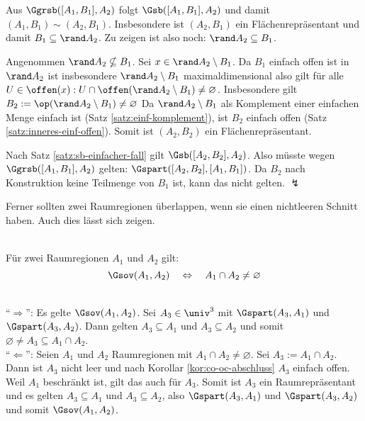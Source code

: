     \begin{bew}
        Aus $\Ggrsb([A_1,B_1],A_2)$ folgt $\Gsb([A_1,B_1],A_2)$ und damit\\
        $(A_1,B_1) \sim (A_2,B_1)$.
        Insbesondere ist $(A_2,B_1)$ ein Flächenrepräsentant und damit $B_1 \subseteq \rand A_2$.
        Zu zeigen ist also noch: $\rand A_2 \subseteq B_1$.

        Angenommen $\rand A_2 \nsubseteq B_1$.
        Sei $x \in \rand A_2 \setminus B_1$. 
        Da $B_1$ einfach offen ist in $\rand A_2$ ist insbesondere $\rand A_2 \setminus B_1$ maximaldimensional also gilt für alle $U \in \offen(x): U \cap \offen(\rand A_2 \setminus B_1) \neq \varnothing$.
        Insbesondere gilt $B_2 := \op(\rand A_2 \setminus B_1) \neq \varnothing$
        Da $\rand A_2 \setminus B_1$ als Komplement einer einfachen Menge einfach ist (Satz \ref{satz:einf-komplement}), ist $B_2$ einfach offen (Satz \ref{satz:inneres-einf-offen}).
        Somit ist $(A_2,B_2)$ ein Flächenrepräsentant.

        Nach Satz \ref{satz:sb-einfacher-fall} gilt $\Gsb([A_2,B_2],A_2)$.
        Also müsste wegen\\
        $\Ggrsb([A_1,B_1],A_2)$ gelten: $\Gspart([A_2,B_2],[A_1,B_1])$.
        Da $B_2$ nach Konstruktion keine Teilmenge von $B_1$ ist, kann das nicht gelten. $\lightning$
    \end{bew}
%    
%    
%    
    Ferner sollten zwei Raumregionen überlappen, wenn sie einen nichtleeren Schnitt haben.
		Auch dies lässt sich zeigen.
    \begin{satz}\label{satz:sov-raumreg}\ \\
        Für zwei Raumregionen $A_1$ und $A_2$ gilt: 
        $$\Gsov(A_1,A_2) \quad \Leftrightarrow \quad A_1 \cap A_2 \neq \varnothing$$
    \end{satz}
    \begin{bew}\ \\
        ``$\boldsymbol{\Rightarrow}$'':
        Es gelte $\Gsov(A_1,A_2)$. 
        Sei $A_3 \in \univ^3$ mit $\Gspart(A_3,A_1)$ und $\Gspart(A_3,A_2)$.
        Dann gelten $A_3 \subseteq A_1$ und $A_3 \subseteq A_2$ und somit $\varnothing \neq A_3 \subseteq A_1 \cap A_2$.\\
        ``$\boldsymbol{\Leftarrow}$'':
        Seien $A_1$ und $A_2$ Raumregionen mit $A_1 \cap A_2 \neq \varnothing$.
        Sei $A_3 := A_1 \cap A_2$.
        Dann ist $A_3$ nicht leer und nach Korollar \ref{kor:co-oc-abschluss} $A_3$ einfach offen.
        Weil $A_1$ beschränkt ist, gilt das auch für $A_3$.
        Somit ist $A_3$ ein Raumrepräsentant und es gelten $A_3 \subseteq A_1$ und $A_3 \subseteq A_2$, also $\Gspart(A_3,A_1)$ und $\Gspart(A_3,A_2)$ und somit $\Gsov(A_1,A_2)$.
    \end{bew}


